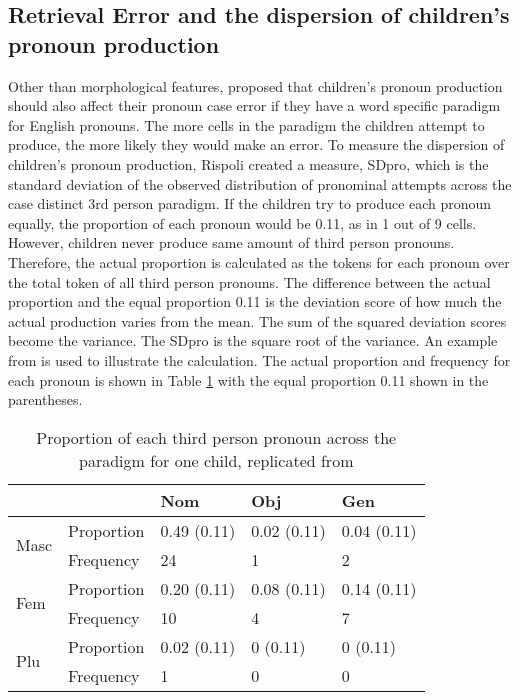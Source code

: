 \subsection{Retrieval Error and the dispersion of children's pronoun production}
\label{section:rispoli20052}
Other than morphological features, \cite{rispoli2005} proposed that children's pronoun production should also affect their pronoun case error if they have a word specific paradigm for English pronouns. The more cells in the paradigm the children attempt to produce, the more likely they would make an error. To measure the dispersion of children's pronoun production, Rispoli created a measure, SDpro, which is the standard deviation of the observed distribution of pronominal attempts across the case distinct 3rd person paradigm. If the children try to produce each pronoun equally, the proportion of each pronoun would be 0.11, as in 1 out of 9 cells. However, children never produce same amount of third person pronouns. Therefore, the actual proportion is calculated as the tokens for each pronoun over the total token of all third person pronouns. The difference between the actual proportion and the equal proportion 0.11 is the deviation score of how much the actual production varies from the mean. The sum of the squared deviation scores become the variance. The SDpro is the square root of the variance. An example from \cite{rispoli2005} is used to illustrate the calculation. The actual proportion and frequency for each pronoun is shown in Table \ref{tab:SDpro} with the equal proportion 0.11 shown in the parentheses. 

\FloatBarrier
\begin{table}[!h]
\centering
\caption{Proportion of each third person pronoun across the paradigm for one child, replicated from \cite{rispoli2005}}
\label{tab:SDpro}
\begin{tabular}{l|l|lll}
\toprule
 &  & Nom & Obj & Gen \\ \hline
\multirow{2}{*}{Masc} & Proportion & 0.49 (0.11) & 0.02 (0.11) & 0.04 (0.11) \\ \cline{2-5} 
 & Frequency & 24 & 1 & 2 \\ \hline
\multirow{2}{*}{Fem} & Proportion & 0.20 (0.11) & 0.08 (0.11) & 0.14 (0.11) \\ \cline{2-5} 
 & Frequency & 10 & 4 & 7 \\ \hline
\multirow{2}{*}{Plu} & Proportion & 0.02 (0.11) & 0 (0.11) & 0 (0.11) \\
 & Frequency & 1 & 0 & 0\\
 \bottomrule
\end{tabular}
\end{table}
\FloatBarrier

